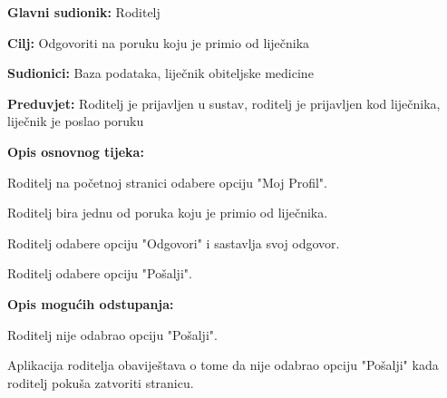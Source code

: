 					\noindent {}
					\begin{packed_item}
						
						\item \textbf{Glavni sudionik: }Roditelj
						\item  \textbf{Cilj:} Odgovoriti na poruku koju je primio od liječnika
						\item  \textbf{Sudionici:} Baza podataka, liječnik obiteljske medicine
						\item  \textbf{Preduvjet:} Roditelj je prijavljen u sustav, roditelj je prijavljen kod liječnika, liječnik je poslao poruku
						\item  \textbf{Opis osnovnog tijeka:}
						
						\item[] \begin{packed_enum}
							
							\item Roditelj na početnoj stranici odabere opciju "Moj Profil".
							\item Roditelj bira jednu od poruka koju je primio od liječnika.
							\item Roditelj odabere opciju "Odgovori" i sastavlja svoj odgovor.
							\item Roditelj odabere opciju "Pošalji".
						\end{packed_enum}
						
						\item  \textbf{Opis mogućih odstupanja:}
						
						\item[] \begin{packed_item}
							
							\item[4.a] Roditelj nije odabrao opciju "Pošalji".
							\item[] \begin{packed_enum}
								
								\item Aplikacija roditelja obaviještava o tome da nije odabrao opciju "Pošalji" kada roditelj pokuša zatvoriti stranicu.
							\end{packed_enum}
							
							
						\end{packed_item}
						
						
					\end{packed_item}
					
